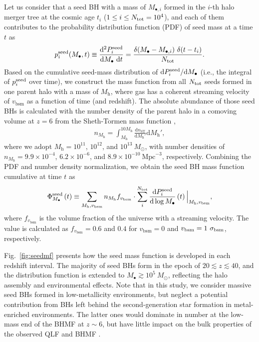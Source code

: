 \documentclass[twocolumn, twocolappendix]{aastex63}
\newcommand{\Msun}{M_\odot}
\newcommand{\Mh}{M_\mathrm{h}}
\newcommand{\Mbh}{M_\bullet}
\newcommand{\vbsm}{v_\mathrm{bsm}}
\newcommand{\D}{\mathrm{d}}
\begin{document}
\begin{CJK*}{UTF8}{gbsn}
Let us consider that a seed BH with a mass of $M_{\bullet,i}$ formed in the $i$-th halo merger tree at the cosmic age 
$t_i$ ($1\leq i \leq N_{\rm tot}=10^4$),
and each of them contributes to the probability distribution function (PDF) of seed mass at a time $t$ as
% 
\begin{equation}
  p^{\rm seed}_i (\Mbh,t)\equiv \frac{\D^2 P^{\rm seed}_i}{\D \Mbh ~\D t}= \frac{ \delta(\Mbh-M_{\bullet,i})~ \delta(t-t_i)}{N_{\rm tot}}.
\end{equation}
%
Based on the cumulative seed-mass distribution of $\D P^{\rm seed}_i/ \D \Mbh$
(i.e., the integral of $p^{\rm seed}_i$ over time),
we construct the mass function from all $N_{\rm tot}$ seeds formed in one parent halo
with a mass of $\Mh$, where gas has a coherent streaming velocity of $\vbsm$ as a function of time (and redshift).
The absolute abundance of those seed BHs is calculated with the number density of the parent halo in a comoving volume at $z=6$ 
from the Sheth-Tormen mass function \citep{2001MNRAS.323....1S},
%
\begin{align}
  n_{\Mh}= \int_{\Mh}^{10\Mh}  \frac{\D n_{\mathrm{ST}}} {\D \Mh'} \D \Mh', 
\end{align}
%
where we adopt $\Mh = 10^{11}$, $10^{12}$, and $10^{13}~\Msun$, with number densities of
$n_{\Mh} = 9.9\times 10^{-4}$, $6.2\times 10^{-6}$, and $8.9\times 10^{-10}~ \text{Mpc}^{-3}$, respectively.
Combining the PDF and number density normalization, we obtain the seed BH mass function cumulative at time $t$ as
%
\begin{align}
\Phi_{\Mbh}^{\rm seed}\left(t\right) \equiv \sum_{\Mh, \vbsm} n_{\Mh} f_{\vbsm} 
\cdot \sum_{i}^{N_{\rm tot}} \frac{\D P^{\rm seed}_i}{\D \log \Mbh}\left(t\right) \Big| _{\Mh, \vbsm},
\end{align}
%
where $f_{\vbsm}$ is the volume fraction of the universe with a streaming velocity.
The value is calculated as $f_{\vbsm} = 0.6$ and $0.4$ for $\vbsm = 0$ and $\vbsm=1~\sigma_{\rm bsm}$, respectively.

Fig.~\ref{fig:seedmf} presents how the seed mass function is developed in each redshift interval.
The majority of seed BHs form in the epoch of $20\lesssim z \lesssim 40$, and the distribution function is 
extended to $M_\bullet \gtrsim 10^5~\Msun$, reflecting the halo assembly and environmental effects.
Note that in this study, we consider massive seed BHs formed in low-metallicity environments,
but neglect a potential contribution from BHs left behind the second-generation star formation in metal-enriched environments.
The latter ones would dominate in number at the low-mass end of the BHMF at $z\sim 6$,
but have little impact on the bulk properties of the observed QLF and BHMF \citep[see][]{2022MNRAS.511..616T}.




\end{CJK*}
\end{document}
